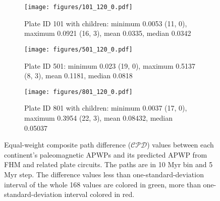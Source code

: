 \begin{figure*}
	\centering
	\begin{subfigure}{1.01\textwidth}
		\texttt{[image: figures/101\_120\_0.pdf]}
		\caption{Plate ID 101 with children: minimum 0.0053 (11, 0),
		maximum 0.0921 (16, 3), mean 0.0335, median 0.0342}\label{fig-nac-dif} %
	\end{subfigure}
	\vspace{.1em} %
	\begin{subfigure}{1.01\textwidth}
		\texttt{[image: figures/501\_120\_0.pdf]}
		\caption{Plate ID 501: minimum 0.023 (19, 0), maximum 0.5137 (8, 3),
		mean 0.1181, median 0.0818}\label{fig-ind-dif} %
	\end{subfigure}
	\vspace{.1em}
	\begin{subfigure}{1.01\textwidth}
		\texttt{[image: figures/801\_120\_0.pdf]}
		\caption{Plate ID 801 with children: minimum 0.0037 (17, 0), maximum
		0.3954 (22, 3), mean 0.08432, median 0.05037}\label{fig-au-dif} %
	\end{subfigure}
	\caption[Differences of each plate's paleomagnetic APWPs versus
its FHM predicted APWP]{Equal-weight composite path difference ($\mathcal{CPD}$)
values between each continent's paleomagnetic APWPs and its predicted APWP from
FHM and related plate circuits. The paths are in 10 Myr bin and 5 Myr step. The
difference values less than one-standard-deviation interval of the whole 168
values are colored in green, more than one-standard-deviation interval colored
in red.}\label{fig-dif} %
\end{figure*}

